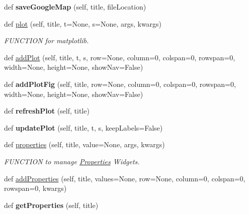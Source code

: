 \begin{DoxyCompactItemize}
def {\bfseries save\+Google\+Map} (self, title, file\+Location)
\item 
def \hyperlink{class_python_01_g_u_i_1_1appjar_1_1gui_a13326043fc52bc57c5026d450df555d3}{plot} (self, title, t=None, s=None, args, kwargs)
\begin{DoxyCompactList}\small\item\em F\+U\+N\+C\+T\+I\+ON for matplotlib. \end{DoxyCompactList}\item 
def \hyperlink{class_python_01_g_u_i_1_1appjar_1_1gui_a9924b1bebbcac84a4e19f1969bf81032}{add\+Plot} (self, title, t, s, row=None, column=0, colspan=0, rowspan=0, width=None, height=None, show\+Nav=False)
\item 
\mbox{\label{class_python_01_g_u_i_1_1appjar_1_1gui_ac280f5d029379c38398f87cb0aa47d97}} 
def {\bfseries add\+Plot\+Fig} (self, title, row=None, column=0, colspan=0, rowspan=0, width=None, height=None, show\+Nav=False)
\item 
\mbox{\label{class_python_01_g_u_i_1_1appjar_1_1gui_a64e23c322ea14c543c6bb0ae8f07543f}} 
def {\bfseries refresh\+Plot} (self, title)
\item 
\mbox{\label{class_python_01_g_u_i_1_1appjar_1_1gui_a337f789d7be5ad84ce634e4b281153a3}} 
def {\bfseries update\+Plot} (self, title, t, s, keep\+Labels=False)
\item 
def \hyperlink{class_python_01_g_u_i_1_1appjar_1_1gui_a50c26e267852e3af712d6040d7963431}{properties} (self, title, value=None, args, kwargs)
\begin{DoxyCompactList}\small\item\em F\+U\+N\+C\+T\+I\+ON to manage \hyperlink{class_python_01_g_u_i_1_1appjar_1_1_properties}{Properties} Widgets. \end{DoxyCompactList}\item 
def \hyperlink{class_python_01_g_u_i_1_1appjar_1_1gui_a25547332eaf669ac5351b453accc1ae2}{add\+Properties} (self, title, values=None, row=None, column=0, colspan=0, rowspan=0, kwargs)
\item 
\mbox{\label{class_python_01_g_u_i_1_1appjar_1_1gui_a1e7a0a7d7080bd44593ca190032b831d}} 
def {\bfseries get\+Properties} (self, title)

\end{DoxyCompactItemize}
